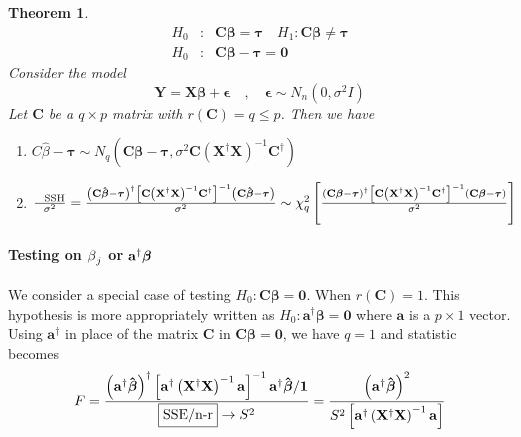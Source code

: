 \documentclass{article}
\newtheorem{theorem}{Theorem}
\begin{document}
\begin{theorem}
\begin{eqnarray*}
H_{0} &:&\mathbf{C\beta =\tau }\quad H_{1}:\mathbf{C\beta \neq \tau } \\
H_{0} &:&\mathbf{C\beta -\tau =0}
\end{eqnarray*}%
\newline
Consider the model%
\begin{equation*}
\mathbf{Y=X\beta +\epsilon \quad ,\quad \epsilon }\sim N_{n}\left( 0,\sigma
^{2}I\right) 
\end{equation*}%
\newline
Let $\mathbf{C}$ be a $q\times p$ matrix with $r\left( \mathbf{C}\right)
=q\leq p$. Then we have

\begin{enumerate}
\item $C\hat{\beta}-\mathbf{\tau }\sim N_{q}\left( \mathbf{C\beta -\tau }%
,\sigma ^{2}\mathbf{C}\left( \mathbf{X}^{\dagger }\mathbf{X}\right) ^{-1}%
\mathbf{C}^{\dagger }\right) $

\item $\frac{\text{SSH}}{\sigma ^{2}}=\frac{\left( \mathbf{C\hat{\beta}-\tau 
}\right) ^{\dagger }\left[ \mathbf{C}\left( \mathbf{X}^{\dagger }\mathbf{X}%
\right) ^{-1}\mathbf{C}^{\dagger }\right] ^{-1}\left( \mathbf{C\hat{\beta}%
-\tau }\right) }{\sigma ^{2}}\sim \chi _{q}^{2}\left[ \frac{\left( \mathbf{%
C\beta -\tau }\right) ^{\dagger }\left[ \mathbf{C}\left( \mathbf{X}^{\dagger
}\mathbf{X}\right) ^{-1}\mathbf{C}^{\dagger }\right] ^{-1}\left( \mathbf{%
C\beta -\tau }\right) }{\sigma ^{2}}\right] $
\end{enumerate}
\end{theorem}

\bigskip 

\paragraph{Testing on $\protect\beta _{j}$ or $\mathbf{a}^{\dagger }\mathbf{%
\protect\beta }$}

We consider a special case of testing $H_{0}:\mathbf{C\beta =0}$. When $%
r\left( \mathbf{C}\right) =1$. This hypothesis is more appropriately written
as $H_{0}:\mathbf{a}^{\dagger }\mathbf{\beta =0}$ where $\mathbf{a}$ is a $%
p\times 1$ vector. Using $\mathbf{a}^{\dagger }$ in place of the matrix $%
\mathbf{C}$ in $\mathbf{C\beta =0}$,\newline
we have $q=1$ and statistic becomes%
\begin{equation*}
F=\frac{\left( \mathbf{a}^{\dagger }\mathbf{\hat{\beta}}\right) ^{\dagger }%
\left[ \mathbf{a}^{\dagger }\left( \mathbf{X}^{\dagger }\mathbf{X}\right)
^{-1}\mathbf{a}\right] ^{-1}\mathbf{a}^{\dagger }\mathbf{\hat{\beta}/1}}{%
\fbox{SSE/n-r}\rightarrow S^{2}}=\frac{\left( \mathbf{a}^{\dagger }\mathbf{%
\hat{\beta}}\right) ^{2}}{S^{2}\left[ \mathbf{a}^{\dagger }\left( \mathbf{X}%
^{\dagger }\mathbf{X}\right) ^{-1}\mathbf{a}\right] }
\end{equation*}
\end{document}
